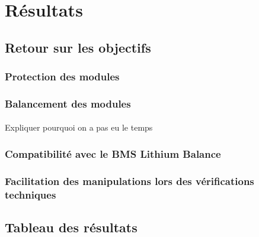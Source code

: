 \section{Résultats}

	\subsection{Retour sur les objectifs}
	
		\subsubsection{Protection des modules}
	
			\paragraph{}

		\subsubsection{Balancement des modules}
			
			\paragraph{}
			Expliquer pourquoi on a pas eu le temps
	
		\subsubsection{Compatibilité avec le BMS Lithium Balance}
	
			\paragraph{}
		
		\subsubsection{Facilitation des manipulations lors des vérifications techniques}
	
			\paragraph{}


	\subsection{Tableau des résultats}

		\paragraph{}
		
